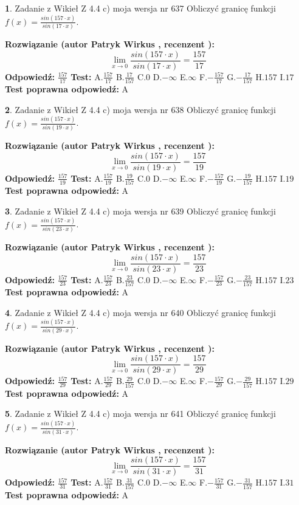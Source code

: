 \documentclass[12pt, a4paper]{article}
\theoremstyle{definition} %
\newtheorem{zad}{}
\newcommand{\zadStart}[1]{\begin{zad}#1\newline}
\newcommand{\zadStop}{\end{zad}}
\newcommand{\rozwStart}[2]{\noindent \textbf{Rozwiązanie (autor #1 , recenzent #2): }\newline}
\newcommand{\rozwStop}{\newline}
\newcommand{\odpStart}{\noindent \textbf{Odpowiedź:}\newline}
\newcommand{\odpStop}{\newline}
\newcommand{\testStart}{\noindent \textbf{Test:}\newline}
\newcommand{\testStop}{\newline}
\newcommand{\kluczStart}{\noindent \textbf{Test poprawna odpowiedź:}\newline}
\newcommand{\kluczStop}{\newline}
\begin{document}
\zadStart{Zadanie z Wikieł Z 4.4 c) moja wersja nr 637}
Obliczyć granicę funkcji $f(x)=\frac{sin(157\cdot x)}{sin(17\cdot x)}$.
\zadStop
\rozwStart{Patryk Wirkus}{}
$$\lim\limits_{x\to 0}\frac{sin(157\cdot x)}{sin(17\cdot x)}=
\frac{157}{17}$$
\rozwStop
\odpStart
$\frac{157}{17}$
\odpStop
\testStart
A.$\frac{157}{17}$
B.$\frac{17}{157}$
C.$0$
D.$-\infty$
E.$\infty$
F.$-\frac{157}{17}$
G.$-\frac{17}{157}$
H.$157$
I.$17$
\testStop
\kluczStart
A
\kluczStop



\zadStart{Zadanie z Wikieł Z 4.4 c) moja wersja nr 638}
Obliczyć granicę funkcji $f(x)=\frac{sin(157\cdot x)}{sin(19\cdot x)}$.
\zadStop
\rozwStart{Patryk Wirkus}{}
$$\lim\limits_{x\to 0}\frac{sin(157\cdot x)}{sin(19\cdot x)}=
\frac{157}{19}$$
\rozwStop
\odpStart
$\frac{157}{19}$
\odpStop
\testStart
A.$\frac{157}{19}$
B.$\frac{19}{157}$
C.$0$
D.$-\infty$
E.$\infty$
F.$-\frac{157}{19}$
G.$-\frac{19}{157}$
H.$157$
I.$19$
\testStop
\kluczStart
A
\kluczStop



\zadStart{Zadanie z Wikieł Z 4.4 c) moja wersja nr 639}
Obliczyć granicę funkcji $f(x)=\frac{sin(157\cdot x)}{sin(23\cdot x)}$.
\zadStop
\rozwStart{Patryk Wirkus}{}
$$\lim\limits_{x\to 0}\frac{sin(157\cdot x)}{sin(23\cdot x)}=
\frac{157}{23}$$
\rozwStop
\odpStart
$\frac{157}{23}$
\odpStop
\testStart
A.$\frac{157}{23}$
B.$\frac{23}{157}$
C.$0$
D.$-\infty$
E.$\infty$
F.$-\frac{157}{23}$
G.$-\frac{23}{157}$
H.$157$
I.$23$
\testStop
\kluczStart
A
\kluczStop



\zadStart{Zadanie z Wikieł Z 4.4 c) moja wersja nr 640}
Obliczyć granicę funkcji $f(x)=\frac{sin(157\cdot x)}{sin(29\cdot x)}$.
\zadStop
\rozwStart{Patryk Wirkus}{}
$$\lim\limits_{x\to 0}\frac{sin(157\cdot x)}{sin(29\cdot x)}=
\frac{157}{29}$$
\rozwStop
\odpStart
$\frac{157}{29}$
\odpStop
\testStart
A.$\frac{157}{29}$
B.$\frac{29}{157}$
C.$0$
D.$-\infty$
E.$\infty$
F.$-\frac{157}{29}$
G.$-\frac{29}{157}$
H.$157$
I.$29$
\testStop
\kluczStart
A
\kluczStop



\zadStart{Zadanie z Wikieł Z 4.4 c) moja wersja nr 641}
Obliczyć granicę funkcji $f(x)=\frac{sin(157\cdot x)}{sin(31\cdot x)}$.
\zadStop
\rozwStart{Patryk Wirkus}{}
$$\lim\limits_{x\to 0}\frac{sin(157\cdot x)}{sin(31\cdot x)}=
\frac{157}{31}$$
\rozwStop
\odpStart
$\frac{157}{31}$
\odpStop
\testStart
A.$\frac{157}{31}$
B.$\frac{31}{157}$
C.$0$
D.$-\infty$
E.$\infty$
F.$-\frac{157}{31}$
G.$-\frac{31}{157}$
H.$157$
I.$31$
\testStop
\kluczStart
A
\kluczStop
\end{document}

